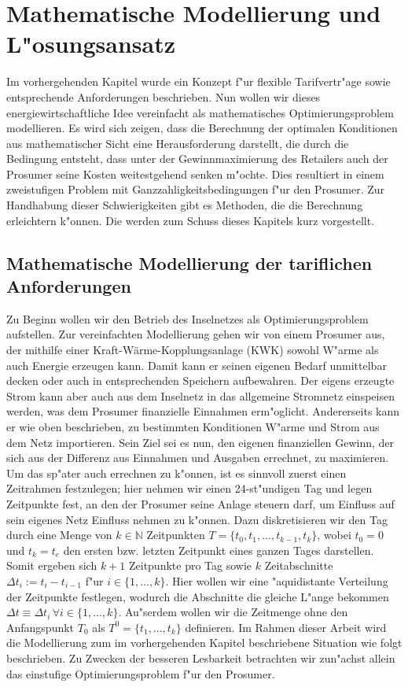 \section{Mathematische Modellierung und L"osungsansatz}

Im vorhergehenden Kapitel wurde ein Konzept f"ur flexible Tarifvertr"age sowie entsprechende Anforderungen beschrieben. Nun wollen wir dieses energiewirtschaftliche Idee vereinfacht als mathematisches Optimierungsproblem modellieren. Es wird sich zeigen, dass die Berechnung der optimalen Konditionen aus mathematischer Sicht eine Herausforderung darstellt, die durch die Bedingung entsteht, dass unter der Gewinnmaximierung des Retailers auch der Prosumer seine Kosten weitestgehend senken m"ochte. Dies resultiert in einem zweistufigen Problem mit Ganzzahligkeitsbedingungen f"ur den Prosumer. Zur Handhabung dieser Schwierigkeiten gibt es Methoden, die die Berechnung erleichtern k"onnen. Die werden zum Schuss dieses Kapitels kurz vorgestellt.

\subsection{Mathematische Modellierung der tariflichen Anforderungen}
Zu Beginn wollen wir den Betrieb des Inselnetzes als Optimierungsproblem aufstellen. Zur vereinfachten Modellierung gehen wir von einem Prosumer aus, der mithilfe einer Kraft-Wärme-Kopplungsanlage (KWK) sowohl W"arme als auch Energie erzeugen kann. 
Damit kann er seinen eigenen Bedarf unmittelbar decken oder auch in entsprechenden Speichern aufbewahren. Der eigens erzeugte Strom kann aber auch aus dem Inselnetz in das allgemeine Stromnetz einspeisen werden, was dem Prosumer finanzielle Einnahmen erm"oglicht. 
Andererseits kann er wie oben beschrieben, zu bestimmten Konditionen W"arme und Strom aus dem Netz importieren. Sein Ziel sei es nun, den eigenen finanziellen Gewinn, der sich aus der Differenz aus Einnahmen und Ausgaben errechnet, zu maximieren. Um das sp"ater auch errechnen zu k"onnen, ist es sinnvoll zuerst einen Zeitrahmen festzulegen; hier nehmen wir einen 24-st"undigen Tag und legen Zeitpunkte fest, an den der Prosumer seine Anlage steuern darf, um Einfluss auf sein eigenes Netz Einfluss nehmen zu k"onnen. 
Dazu diskretisieren wir den Tag durch eine Menge von $k \in \mathbb{N}$ Zeitpunkten $T=\{t_0, t_1,...,t_{k-1},t_k\}$, wobei $t_0=0$ und $t_k=t_e$ den ersten bzw. letzten Zeitpunkt eines ganzen Tages darstellen. Somit ergeben sich $k+1$ Zeitpunkte pro Tag sowie $k$ Zeitabschnitte $\Delta t_i:= t_i - t_{i-1}$ f"ur $i \in \{1,...,k\}$. Hier wollen wir eine "aquidistante Verteilung der Zeitpunkte festlegen, wodurch die Abschnitte die gleiche L"ange bekommen $\Delta t \equiv \Delta t_i \, \forall i \in \{1,...,k\}$. Au"serdem wollen wir die Zeitmenge ohne den Anfangspunkt $T_0$ als $T^0=\{t_1,...,t_k\}$ definieren. 
Im Rahmen dieser Arbeit wird die Modellierung zum im vorhergehenden Kapitel beschriebene Situation wie folgt beschrieben. Zu Zwecken der besseren Lesbarkeit betrachten wir zun"achst allein das einstufige Optimierungsproblem f"ur den Prosumer.

